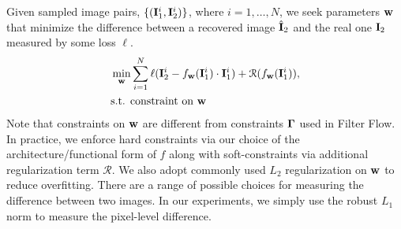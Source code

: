 \documentclass[10pt,twocolumn,letterpaper]{article}
\def\I{{\bf I}}
\def\w{{\bf w}}
\begin{document}
Given sampled image pairs, $\{(\I_1^i, \I_2^i)\}$, where $i=1,\dots, N$, we seek
parameters $\w$ that minimize the difference between a recovered image
$\hat\I_2$ and the real one $\I_2$ measured by some loss $\ell$.
\begin{equation}
\begin{split}
& \min_{\w} \sum_{i=1}^{N} \ell( \I_2^i - f_{\w}(\I_1^i)\cdot\I_1^i ) + \mathcal{R}(f_{\w}(\I_1^i)), \\
& \text{s.t.  constraint on } \w
\end{split}
\label{eq:predictivefilterflow}
\end{equation}
Note that constraints on $\w$ are different from constraints ${\bf\Gamma}$ used in
Filter Flow.  In practice, we enforce hard constraints via our choice of the
architecture/functional form of $f$ along with soft-constraints via additional
regularization term $\mathcal{R}$. We also adopt commonly used $L_2$
regularization on $\w$ to reduce overfitting. There are a range of possible
choices for measuring the difference between two images. In our experiments, we
simply use the robust $L_1$ norm to measure the pixel-level difference.

\end{document}
